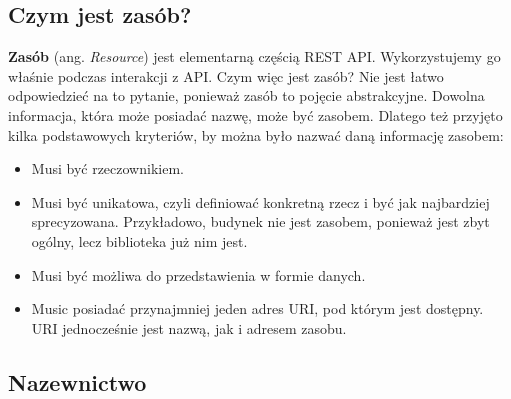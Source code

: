 \documentclass[oneside,polski,logo,indent]{amuthesis}
\begin{document}
\begin{center}
\subsection{Czym jest zasób?}
\end{center}

\textbf{Zasób} (ang. \emph{Resource}) jest elementarną częścią REST API. Wykorzystujemy go właśnie podczas interakcji z API. Czym więc jest zasób? Nie jest łatwo odpowiedzieć na to pytanie, ponieważ zasób to pojęcie abstrakcyjne. Dowolna informacja, która może posiadać nazwę, może być zasobem. Dlatego też przyjęto kilka podstawowych kryteriów, by można było nazwać daną informację zasobem:\newline


\begin{itemize}
\item Musi być rzeczownikiem.
\item Musi być unikatowa, czyli definiować konkretną rzecz i być jak najbardziej sprecyzowana. Przykładowo, budynek nie jest zasobem, ponieważ jest zbyt ogólny, lecz biblioteka już nim jest. 
\item Musi być możliwa do przedstawienia w formie danych.
\item Music posiadać przynajmniej jeden adres URI, pod którym jest dostępny. URI jednocześnie jest nazwą, jak i adresem zasobu.\newline
\end{itemize}


\begin{center}
\subsection{Nazewnictwo}
\end{center}
\end{document}
